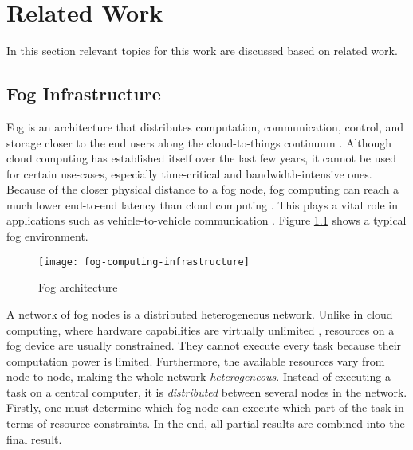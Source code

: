\chapter{Related Work\label{cha:relwork}}
In this section relevant topics for this work are discussed based on related work.

\section{Fog Infrastructure}
Fog is an architecture that distributes computation, communication, control, and storage closer to the end users along the cloud-to-things continuum \cite{fog-research-opportunities}.
Although cloud computing has established itself over the last few years, it cannot be used for certain use-cases, especially time-critical and bandwidth-intensive ones. Because of the closer physical distance to a fog node, fog computing can reach a much lower end-to-end latency than cloud computing \cite{mobility-aware-scheduling}\cite{novel-load-balancing}.
This plays a vital role in applications such as vehicle-to-vehicle communication \cite{novel-load-balancing}.
Figure \ref{fig:foginfrastructure} shows a typical fog environment.\\

\begin{figure}[htb]
    \centering
    \texttt{[image: fog-computing-infrastructure]}
    \caption{Fog architecture}
    \label{fig:foginfrastructure}
\end{figure}

A network of fog nodes is a distributed heterogeneous network. Unlike in cloud computing, where hardware capabilities are virtually unlimited \cite{fogtorch}, resources on a fog device are usually constrained. They cannot execute every task because their computation power is limited. Furthermore, the available resources vary from node to node, making the whole network \textit{heterogeneous}. Instead of executing a task on a central computer, it is \textit{distributed} between several nodes in the network.
Firstly, one must determine which fog node can execute which part of the task in terms of resource-constraints.
In the end, all partial results are combined into the final result.


